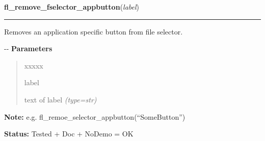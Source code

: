     \label{xformslib:flgoodies:fl_remove_fselector_appbutton}

    \vspace{0.5ex}

\hspace{.8\funcindent}\begin{boxedminipage}{\funcwidth}

    \raggedright \textbf{fl\_remove\_fselector\_appbutton}(\textit{label})

    \vspace{-1.5ex}

    \rule{\textwidth}{0.5\fboxrule}
\setlength{\parskip}{2ex}

Removes an application specific button from file selector.

-{}-
\setlength{\parskip}{1ex}
      \textbf{Parameters}
      \vspace{-1ex}

      \begin{quote}
        \begin{Ventry}{xxxxx}

          \item[label]


text of label
            {\it (type=str)}

        \end{Ventry}

      \end{quote}

\textbf{Note:} 
e.g. fl\_remoe\_selector\_appbutton(``SomeButton'')


\textbf{Status:} 
Tested + Doc + NoDemo = OK


    \end{boxedminipage}

    \label{xformslib:flgoodies:fl_disable_fselector_cache}

    \vspace{0.5ex}

